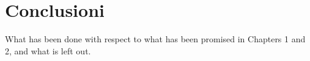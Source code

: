\chapter{Conclusioni}

What has been done with respect to what has been promised in Chapters 1 and 2, and what is left out.
